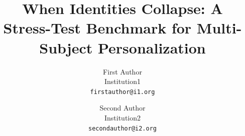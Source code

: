 \documentclass[10pt,twocolumn,letterpaper]{article}
\title{When Identities Collapse: A Stress-Test Benchmark for Multi-Subject Personalization}
\author{First Author\\
Institution1\\
{\tt\small firstauthor@i1.org}
\and
Second Author\\
Institution2\\
{\tt\small secondauthor@i2.org}
}
\begin{document}
\maketitle
    






{
    \small
    
    
}

% 
\end{document}

